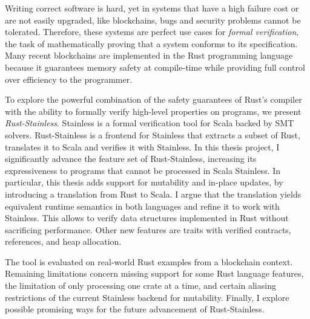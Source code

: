 Writing correct software is hard, yet in systems that have a high failure cost
or are not easily upgraded, like blockchains, bugs and security problems cannot
be tolerated. Therefore, these systems are perfect use cases for \emph{formal
verification}, the task of mathematically proving that a system conforms to its
specification. Many recent blockchains are implemented in the Rust programming
language because it guarantees memory safety at compile-time while providing
full control over efficiency to the programmer.

To explore the powerful combination of the safety guarantees of Rust's compiler
with the ability to formally verify high-level properties on programs, we
present \emph{Rust-Stainless}. Stainless is a formal verification tool for Scala
backed by SMT solvers. Rust-Stainless is a frontend for Stainless that extracts
a subset of Rust, translates it to Scala and verifies it with Stainless. In this
thesis project, I significantly advance the feature set of Rust-Stainless,
increasing its expressiveness to programs that cannot be processed in Scala
Stainless. In particular, this thesis adds support for mutability and in-place
updates, by introducing a translation from Rust to Scala. I argue that the
translation yields equivalent runtime semantics in both languages and refine it
to work with Stainless. This allows to verify data structures implemented in
Rust without sacrificing performance. Other new features are traits with
verified contracts, references, and heap allocation.

The tool is evaluated on real-world Rust examples from a blockchain context.
Remaining limitations concern missing support for some Rust language features,
the limitation of only processing one crate at a time, and certain aliasing
restrictions of the current Stainless backend for mutability. Finally, I explore
possible promising ways for the future advancement of Rust-Stainless.
